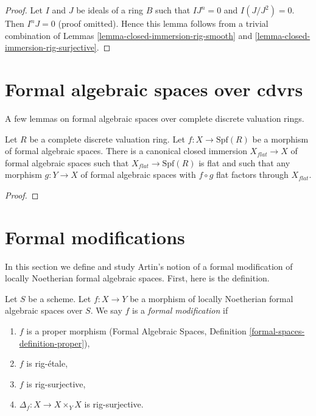 \begin{proof}
Let $I$ and $J$ be ideals of a ring $B$ such that $IJ^n = 0$ and
$I(J/J^2) = 0$. Then $I^nJ = 0$ (proof omitted).
Hence this lemma follows from a trivial combination of
Lemmas \ref{lemma-closed-immersion-rig-smooth} and
\ref{lemma-closed-immersion-rig-surjective}.
\end{proof}







\section{Formal algebraic spaces over cdvrs}
\label{section-over-cdrv}

\noindent
A few lemmas on formal algebraic spaces over complete discrete valuation rings.

\begin{lemma}
\label{lemma-flat-locus}
Let $R$ be a complete discrete valuation ring. Let
$f : X \to \text{Spf}(R)$ be a morphism of formal algebraic spaces.
There is a canonical closed immersion $X_{flat} \to X$
of formal algebraic spaces such that $X_{flat} \to \text{Spf}(R)$
is flat and such that any morphism $g : Y \to X$ of formal algebraic
spaces with $f \circ g$ flat factors through $X_{flat}$.
\end{lemma}

\begin{proof}



\end{proof}








\section{Formal modifications}
\label{section-formal-modifications}

\noindent
In this section we define and study Artin's notion of a formal modification
of locally Noetherian formal algebraic spaces. First, here is the
definition.

\begin{definition}
\label{definition-formal-modification}
Let $S$ be a scheme. Let $f : X \to Y$ be a morphism of
locally Noetherian formal algebraic spaces over $S$. We say $f$ is a
{\it formal modification} if
\begin{enumerate}
\item $f$ is a proper morphism (Formal Algebraic Spaces, Definition
\ref{formal-spaces-definition-proper}),
\item $f$ is rig-\'etale,
\item $f$ is rig-surjective,
\item $\Delta_f : X \to X \times_Y X$ is rig-surjective.
\end{enumerate}
\end{definition}

